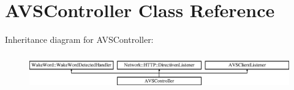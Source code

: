 \hypertarget{classAVSController}{}\section{A\+V\+S\+Controller Class Reference}
\label{classAVSController}
Inheritance diagram for A\+V\+S\+Controller\+:\begin{figure}[H]
\begin{center}
\leavevmode
\includegraphics[height=1.536351cm]{d3/d4e/classAVSController}
\end{center}
\end{figure}
